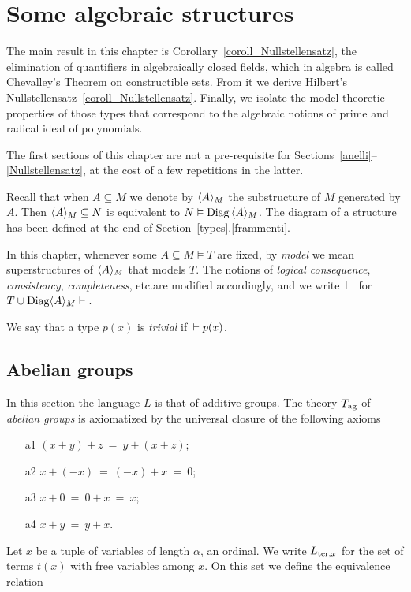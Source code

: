 \documentclass[creche.tex]{subfiles}
\begin{document}
\chapter{Some algebraic structures}
\label{algebraic}

\def\medrel#1{\parbox[b]{6ex}{\hfil$#1$}}
\def\ceq#1#2#3{\parbox[b]{25ex}{$\displaystyle #1$}\medrel{#2}$\displaystyle #3$}

The main result in this chapter is Corollary~\ref{coroll_Nullstellensatz}, the elimination of quantifiers in algebraically closed fields, which in algebra is called Chevalley's Theorem on constructible sets. From it we derive Hilbert's Nullstellensatz~\ref{coroll_Nullstellensatz}. Finally, we isolate the model theoretic properties of those types that correspond to the algebraic notions of prime and radical ideal of polynomials.

The first sections of this chapter are not a pre-requisite for Sections~\ref{anelli}\kern1.5pt--\kern1pt\ref{Nullstellensatz}, at the cost of a few repetitions in the latter.

\begin{notation}\label{notation1}
Recall that when $A\subseteq M$ we denote by \emph{$\langle A\rangle_M$\/} the substructure of $M$ generated by $A$. Then $\langle A\rangle_M\subseteq N$ is equivalent to $N\vDash {\rm Diag}\,\langle A\rangle_M$. The diagram of a structure has been defined at the end of Section~\hyperref[frammenti]{\ref*{types}.\ref*{frammenti}}.

In this chapter, whenever some $A\subseteq M\models T$ are fixed, by \textit{model\/} we mean superstructures of $\langle A\rangle_M$ that models $T$. The notions of \textit{logical consequence}, \textit{consistency}, \textit{completeness}, etc.\@ are modified accordingly, and we write $\,\vdash\,$ for $T\cup{\rm Diag}\langle A\rangle_M\vdash\,$. 

We say that a type $p(x)$ is \emph{trivial\/} if $\,\vdash p(x)$.\QED
\end{notation}

\section{Abelian groups}
\label{gruppi}
In this section the language $L$ is that of additive groups. The theory \emph{$T_{\rm ag}$} of \emph{abelian groups\/} is axiomatized by the universal closure of the following axioms
\begin{itemize}
\item[a1] $(x+y) +z\ =\ y+(x+z)$;
\item[a2] $x+(-x)\ =\ (-x)+x\ =\ 0$;
\item[a3] $x+0\ = \ 0+x\ = \ x$;
\item[a4] $x+y\ =\ y+x$.
\end{itemize}
Let $x$ be a tuple of variables of length $\alpha$, an ordinal. We write $L_{{\rm ter},x}$ for the set of terms $t(x)$ with free variables among $x$. On this set we define the equivalence relation
\end{document}
